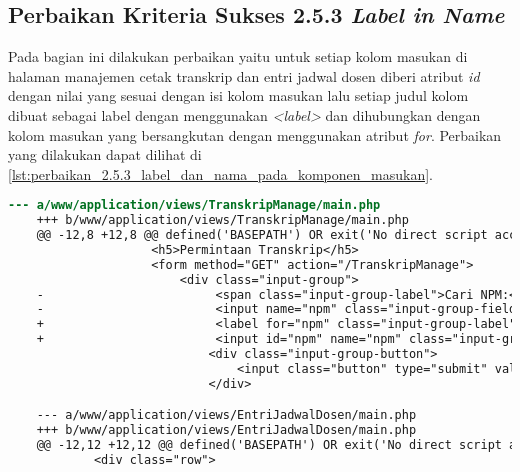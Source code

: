 \subsection{Perbaikan Kriteria Sukses 2.5.3 \textit{Label in Name}}
\label{subsec:perbaikan_kriteria_sukses_2.5.3}
Pada bagian ini dilakukan perbaikan yaitu untuk setiap kolom masukan di halaman manajemen cetak transkrip dan entri jadwal dosen diberi atribut \textit{id} dengan nilai yang sesuai dengan isi kolom masukan lalu setiap judul kolom dibuat sebagai label dengan menggunakan \textit{<label>} dan dihubungkan dengan kolom masukan yang bersangkutan dengan menggunakan atribut \textit{for}. Perbaikan yang dilakukan dapat dilihat di \ref{lst:perbaikan_2.5.3_label_dan_nama_pada_komponen_masukan}.

\begin{lstlisting}[frame=single, label={lst:perbaikan_2.5.3_label_dan_nama_pada_komponen_masukan}, language=diff, caption=Perbaikan Kriteria Sukses 2.5.3 - Label dan Nama Pada Komponen Masukan]
    --- a/www/application/views/TranskripManage/main.php
    +++ b/www/application/views/TranskripManage/main.php
    @@ -12,8 +12,8 @@ defined('BASEPATH') OR exit('No direct script access allowed');
                    <h5>Permintaan Transkrip</h5>
                    <form method="GET" action="/TranskripManage">
                        <div class="input-group">
    -                        <span class="input-group-label">Cari NPM:</span>
    -                        <input name="npm" class="input-group-field" type="text" placeholder="2013730013" maxlength="10" minlength="10"<?= $npmQuery === NULL ? '' : " value='$npmQuery'" ?>/>
    +                        <label for="npm" class="input-group-label">Cari NPM:</label>
    +                        <input id="npm" name="npm" class="input-group-field" type="text" placeholder="2013730013" maxlength="10" minlength="10"<?= $npmQuery === NULL ? '' : " value='$npmQuery'" ?>/>
                            <div class="input-group-button">
                                <input class="button" type="submit" value="Cari"/>
                            </div>

    --- a/www/application/views/EntriJadwalDosen/main.php
    +++ b/www/application/views/EntriJadwalDosen/main.php
    @@ -12,12 +12,12 @@ defined('BASEPATH') OR exit('No direct script access allowed');
            <div class="row">
    

\end{lstlisting}
